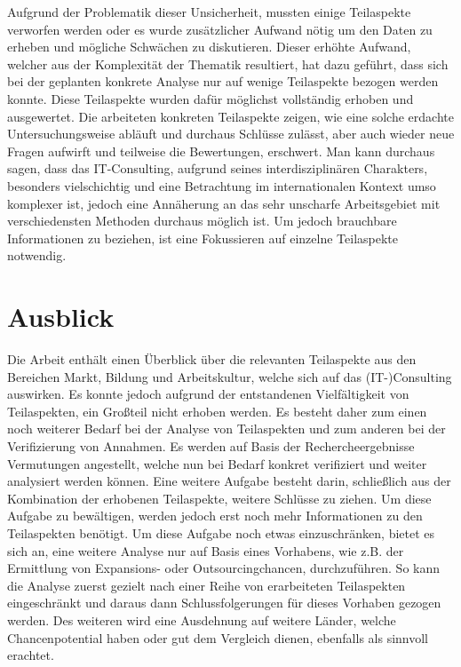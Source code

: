 Aufgrund der Problematik dieser Unsicherheit, mussten einige Teilaspekte verworfen werden oder es wurde zusätzlicher Aufwand nötig um den Daten zu erheben und mögliche Schwächen zu diskutieren. 
Dieser erhöhte Aufwand, welcher aus der Komplexität der Thematik resultiert, hat dazu geführt, dass sich bei der geplanten konkrete Analyse nur auf wenige Teilaspekte bezogen werden konnte. Diese Teilaspekte wurden dafür möglichst vollständig erhoben und ausgewertet. Die arbeiteten konkreten Teilaspekte zeigen, wie eine solche erdachte Untersuchungsweise abläuft und durchaus Schlüsse zulässt, aber auch wieder neue Fragen aufwirft und teilweise die Bewertungen, erschwert.
Man kann durchaus sagen, dass das IT-Consulting, aufgrund seines interdisziplinären Charakters, besonders vielschichtig und eine Betrachtung im internationalen Kontext umso komplexer ist, jedoch eine Annäherung an das sehr unscharfe Arbeitsgebiet mit verschiedensten Methoden durchaus möglich ist. Um jedoch brauchbare Informationen zu beziehen, ist eine Fokussieren auf einzelne Teilaspekte notwendig.
\section{Ausblick}
Die Arbeit enthält einen Überblick über die relevanten Teilaspekte aus den Bereichen Markt, Bildung und Arbeitskultur, welche sich auf das (IT-)Consulting auswirken.
Es konnte jedoch aufgrund der entstandenen Vielfältigkeit von Teilaspekten, ein Großteil nicht erhoben werden. Es besteht daher zum einen noch weiterer Bedarf bei der Analyse von Teilaspekten und zum anderen bei der Verifizierung von Annahmen. Es werden auf Basis der Rechercheergebnisse Vermutungen angestellt, welche nun bei Bedarf konkret verifiziert und weiter analysiert werden können.
Eine weitere Aufgabe besteht darin, schließlich aus der Kombination der erhobenen Teilaspekte, weitere Schlüsse zu ziehen. Um diese Aufgabe zu bewältigen, werden jedoch erst noch mehr Informationen zu den Teilaspekten benötigt.
Um diese Aufgabe noch etwas einzuschränken, bietet es sich an, eine weitere Analyse nur auf Basis eines Vorhabens, wie z.B. der Ermittlung von Expansions- oder Outsourcingchancen, durchzuführen. So kann die Analyse zuerst gezielt nach einer Reihe von erarbeiteten Teilaspekten eingeschränkt und daraus dann Schlussfolgerungen für dieses Vorhaben gezogen werden.
Des weiteren wird eine Ausdehnung auf weitere Länder, welche Chancenpotential haben oder gut dem Vergleich dienen, ebenfalls als sinnvoll erachtet.